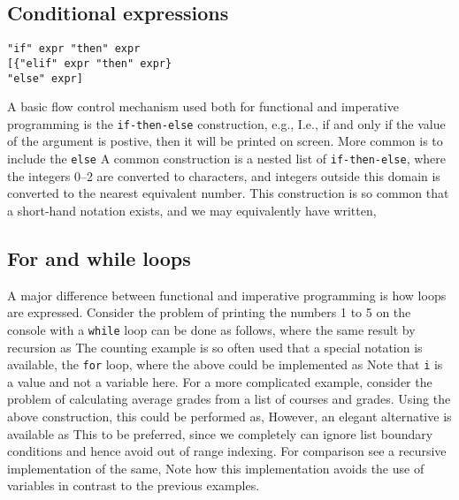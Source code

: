 \subsection{Conditional expressions}
\begin{lstlisting}[language=EBNF]
"if" expr "then" expr 
[{"elif" expr "then" expr}
"else" expr]
\end{lstlisting}
A basic flow control mechanism used both for functional and imperative programming is the \texttt{if-then-else} construction, e.g.,
I.e., if and only if the value of the argument is postive, then it will be printed on screen. More common is to include the \texttt{else} 
A common construction is a nested list of \texttt{if-then-else},
where the integers 0--2 are converted to characters, and integers outside this domain is converted to the nearest equivalent number. This construction is so common that a short-hand notation exists, and we may equivalently have written,

\subsection{For and while loops}
A major difference between functional and imperative programming is how loops are expressed. Consider the problem of printing the numbers 1 to 5 on the console with a \texttt{while} loop can be done as follows,
where the same result by recursion as
The counting example is so often used that a special notation is available, the \texttt{for} loop, where the above could be implemented as
Note that \texttt{i} is a value and not a variable here. For a more complicated example, consider the problem of calculating average grades from a list of courses and grades. Using the above construction, this could be performed as,
However, an elegant alternative is available as
This to be preferred, since we completely can ignore list boundary conditions and hence avoid out of range indexing. For comparison see a recursive implementation of the same,
Note how this implementation avoids the use of variables in contrast to the previous examples.


